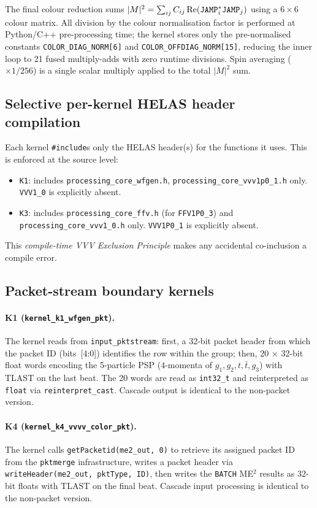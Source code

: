 The final colour reduction sums $|M|^2 = \sum_{ij} C_{ij} \operatorname{Re}
(\texttt{JAMP}_i^* \texttt{JAMP}_j)$ using a $6\times 6$ colour matrix.  All division by the
colour normalisation factor is performed at Python/C++ pre-processing time;
the \aie kernel stores only the pre-normalised constants
\texttt{COLOR\_DIAG\_NORM[6]} and \texttt{COLOR\_OFFDIAG\_NORM[15]}, reducing
the inner loop to 21 fused multiply-adds with zero runtime divisions.  Spin
averaging ($\times 1/256$) is a single scalar multiply applied to the total
$|M|^2$ sum.

\subsection{Selective per-kernel HELAS header compilation}

Each kernel \texttt{\#include}s only the HELAS header(s) for the functions it
uses.  This is enforced at the source level:
\begin{itemize}
  \item \texttt{K1}: includes \texttt{processing\_core\_wfgen.h},
    \texttt{processing\_core\_vvv1p0\_1.h} only.  \texttt{VVV1\_0} is
    explicitly absent.
  \item \texttt{K3}: includes \texttt{processing\_core\_ffv.h}
    (for \texttt{FFV1P0\_3}) and \texttt{processing\_core\_vvv1\_0.h} only.
    \texttt{VVV1P0\_1} is explicitly absent.
\end{itemize}
This \emph{compile-time VVV Exclusion Principle} makes any accidental
co-inclusion a compile error.

\subsection{Packet-stream boundary kernels}

\paragraph{K1 (\texttt{kernel\_k1\_wfgen\_pkt}).}
The kernel reads from \texttt{input\_pktstream}: first, a 32-bit packet header
from which the packet ID (bits~[4:0]) identifies the row within the group;
then, 20 $\times$ 32-bit float words encoding the 5-particle PSP
($4$-momenta of $g_1, g_2, t, \bar{t}, g_3$) with TLAST on the last beat.
The 20 words are read as \texttt{int32\_t} and reinterpreted as \texttt{float}
via \texttt{reinterpret\_cast}.  Cascade output is identical to the non-packet
version.

\paragraph{K4 (\texttt{kernel\_k4\_vvvv\_color\_pkt}).}
The kernel calls \texttt{getPacketid(me2\_out, 0)} to retrieve its assigned
packet ID from the \texttt{pktmerge} infrastructure, writes a packet header
via \texttt{writeHeader(me2\_out, pktType, ID)}, then writes the
\texttt{BATCH} ME$^2$ results as 32-bit floats with TLAST on the final beat.
Cascade input processing is identical to the non-packet version.
